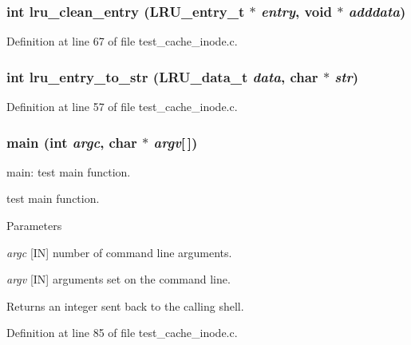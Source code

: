 \subsubsection[{lru\_\-clean\_\-entry}]{\setlength{\rightskip}{0pt plus 5cm}int lru\_\-clean\_\-entry (LRU\_\-entry\_\-t $\ast$ {\em entry}, \/  void $\ast$ {\em adddata})}\label{test__cache__inode_8c_a27ecbab481a3103e078489a212a52e3f}


Definition at line 67 of file test\_\-cache\_\-inode.c.
\subsubsection[{lru\_\-entry\_\-to\_\-str}]{\setlength{\rightskip}{0pt plus 5cm}int lru\_\-entry\_\-to\_\-str (LRU\_\-data\_\-t {\em data}, \/  char $\ast$ {\em str})}\label{test__cache__inode_8c_ad3e6e5506644e1986e6475939863ad3e}


Definition at line 57 of file test\_\-cache\_\-inode.c.
\subsubsection[{main}]{\setlength{\rightskip}{0pt plus 5cm}main (int {\em argc}, \/  char $\ast$ {\em argv}[$\,$])}\label{test__cache__inode_8c_ae0665038b72011f5c680c660fcb59459}
main: test main function.

test main function.


\begin{DoxyParams}{Parameters}
\item[{\em argc}][IN] number of command line arguments. \item[{\em argv}][IN] arguments set on the command line.\end{DoxyParams}
\begin{DoxyReturn}{Returns}
an integer sent back to the calling shell. 
\end{DoxyReturn}


Definition at line 85 of file test\_\-cache\_\-inode.c.